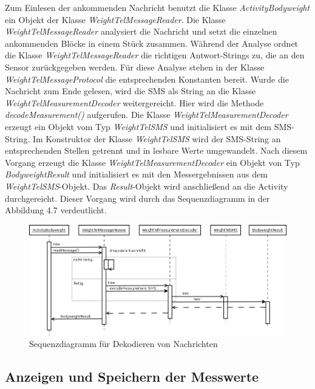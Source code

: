 Zum Einlesen der ankommenden Nachricht benutzt die Klasse \emph{ActivityBodyweight} ein Objekt der 
Klasse \emph{WeightTelMessageReader}.
Die Klasse \emph{WeightTelMessageReader} analysiert  die Nachricht und setzt die einzelnen ankommenden Bl\"ocke in einem St\"uck zusammen.
W\"ahrend der Analyse ordnet die Klasse \emph{WeightTelMessageReader} die richtigen Antwort-Strings zu, 
die an den Sensor zur\"uckgegeben werden.
F\"ur diese Analyse stehen in der Klasse \emph{WeightTelMessageProtocol} die entsprechenden Konstanten bereit.
Wurde die Nachricht zum Ende gelesen, wird die SMS als String an die Klasse \emph{WeightTelMeasurementDecoder} weitergereicht.
Hier wird die Methode \emph{decodeMeasurement()} aufgerufen.
Die Klasse \emph{WeightTelMeasurementDecoder} erzeugt ein Objekt vom Typ \emph{WeightTelSMS} und initialisiert es mit dem SMS-String.
Im Konstruktor der Klasse \emph{WeightTelSMS} wird der SMS-String an entsprechenden Stellen getrennt und in lesbare Werte umgewandelt.
Nach diesem Vorgang erzeugt die Klasse \emph{WeightTelMeasurementDecoder} ein Objekt von Typ \emph{BodyweightResult} und 
initialisiert es mit den Messergebnissen aus dem \emph{WeightTelSMS}-Objekt.
Das \emph{Result}-Objekt wird anschlie\ss{}end an die Activity durchgereicht.
Dieser Vorgang wird durch das Sequenzdiagramm in der Abbildung 4.7 verdeutlicht.\\

\begin{figure}[h]
  \centering
  \includegraphics[scale=0.45]{diagramme/kapitel4/sequenzdiagramme/weighttel_messagedecode.png}
  \caption{Sequenzdiagramm f\"ur Dekodieren von Nachrichten}
  
\end{figure}

\subsection{Anzeigen und Speichern der Messwerte}

